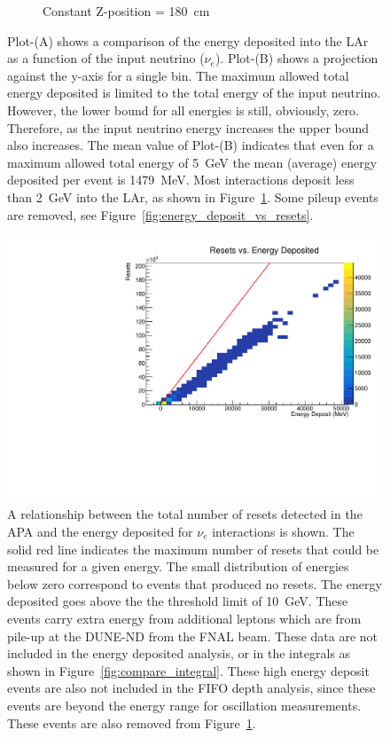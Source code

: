 \begin{figure}
\begin{subfigure}{.5\textwidth}
  \caption{Constant Z-position = 180~\unit{cm}}
\end{subfigure}
\caption{Plot-(A) shows a comparison of the energy deposited into the LAr as a function of the input neutrino ($\nu_{e}$).
Plot-(B) shows a projection against the y-axis for a single bin.
The maximum allowed total energy deposited is limited to the total energy of the input neutrino.
However, the lower bound for all energies is still, obviously, zero.
Therefore, as the input neutrino energy increases the upper bound also increases.
The mean value of Plot-(B) indicates that even for a maximum allowed total energy of 5~\unit{GeV} the mean (average) energy deposited per event is 1479~\unit{MeV}.
Most interactions deposit less than 2~\unit{GeV} into the LAr, as shown in Figure~\ref{fig:example_energy_deposit}.
Some pileup events are removed, see Figure~\ref{fig:energy_deposit_vs_resets}.
}
\label{fig:example_energy_deposit}
\end{figure}

\begin{figure}[]
\centering
\includegraphics[width=\textwidth]{images/resets_vs_energy_deposit.pdf}
\caption{A relationship between the total number of resets detected in the APA and the energy deposited for $\nu_{e}$ interactions is shown.
The solid red line indicates the maximum number of resets that could be measured for a given energy.
The small distribution of energies below zero correspond to events that produced no resets.
The energy deposited goes above the the threshold limit of 10~\unit{GeV}.
These events carry extra energy from additional leptons which are from pile-up at the DUNE-ND from the FNAL beam.
These data are not included in the energy deposited analysis, or in the integrals as shown in Figure~\ref{fig:compare_integral}.
These high energy deposit events are also not included in the FIFO depth analysis, since these events are beyond the energy range for oscillation measurements.
These events are also removed from Figure~\ref{fig:example_energy_deposit}.
}
\end{figure}~\label{fig:energy_deposit_vs_resets}

